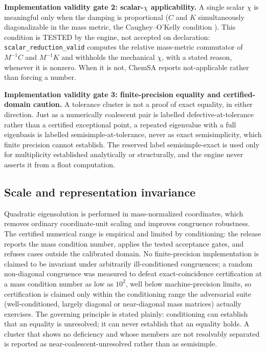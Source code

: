 \textbf{Implementation validity gate 2: scalar-\(\chi\) applicability.} A single scalar \(\chi\) is meaningful only when the damping is proportional (\(C\) and \(K\) simultaneously diagonalizable in the mass metric, the Caughey--O'Kelly condition \citep{caughey}). This condition is TESTED by the engine, not accepted on declaration: \texttt{scalar\_reduction\_valid} computes the relative mass-metric commutator of \(M^{-1}C\) and \(M^{-1}K\) and withholds the mechanical \(\chi\), with a stated reason, whenever it is nonzero. When it is not, ChemSA reports not-applicable rather than forcing a number.

\textbf{Implementation validity gate 3: finite-precision equality and certified-domain caution.} A tolerance cluster is not a proof of exact equality, in either direction. Just as a numerically coalescent pair is labelled defective-at-tolerance rather than a certified exceptional point, a repeated eigenvalue with a full eigenbasis is labelled semisimple-at-tolerance, never as exact semisimplicity, which finite precision cannot establish. The reserved label semisimple-exact is used only for multiplicity established analytically or structurally, and the engine never asserts it from a float computation.

\subsection{Scale and representation invariance}

Quadratic eigensolution is performed in mass-normalized coordinates, which removes ordinary coordinate-unit scaling and improves congruence robustness. The certified numerical range is empirical and limited by conditioning: the release reports the mass condition number, applies the tested acceptance gates, and refuses cases outside the calibrated domain. No finite-precision implementation is claimed to be invariant under arbitrarily ill-conditioned congruences; a random non-diagonal congruence was measured to defeat exact-coincidence certification at a mass condition number as low as \(10^2\), well below machine-precision limits, so certification is claimed only within the conditioning range the adversarial suite (well-conditioned, largely diagonal or near-diagonal mass matrices) actually exercises. The governing principle is stated plainly: conditioning can establish that an equality is unresolved; it can never establish that an equality holds. A cluster that shows no deficiency and whose members are not resolvably separated is reported as near-coalescent-unresolved rather than as semisimple.

